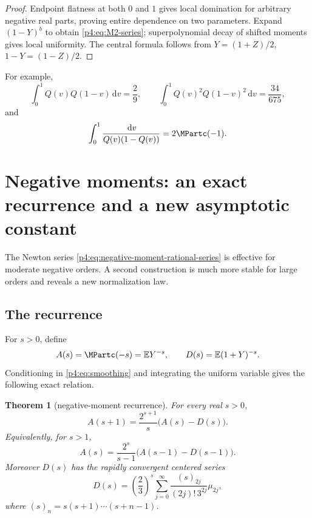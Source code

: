 \documentclass[11pt,oneside]{article}
\newtheorem{theorem}{Theorem}[section]
\theoremstyle{definition}
\theoremstyle{remark}
\newcommand{\Q}{Q}
\newcommand{\E}{\mathbb E}
\newcommand{\dd}{\,\mathrm d}
\newcommand{\1}{\mathbf 1}
\begin{document}
\begin{proof}
Endpoint flatness at both \(0\) and \(1\) gives local domination for arbitrary negative
real parts, proving entire dependence on two parameters.  Expand \((1-Y)^b\) to obtain
\cref{p4:eq:M2-series}; superpolynomial decay of shifted moments gives local uniformity.
The central formula follows from \(Y=(1+Z)/2\), \(1-Y=(1-Z)/2\).
\end{proof}

For example,
\begin{equation}\label{p4:eq:M2-examples}
 \int_0^1\Q(v)\Q(1-v)\dd v=\frac29,
 \qquad
 \int_0^1\Q(v)^2\Q(1-v)^2\dd v=\frac{34}{675},
\end{equation}
and
\begin{equation}\label{p4:eq:M2-negative-example}
 \int_0^1\frac{\dd v}{\Q(v)(1-\Q(v))}=2\MPartc(-1).
\end{equation}

\section{Negative moments: an exact recurrence and a new asymptotic constant}

The Newton series \cref{p4:eq:negative-moment-rational-series} is effective for moderate
negative orders.  A second construction is much more stable for large orders and reveals
a new normalization law.

\subsection{The recurrence}

For \(s>0\), define
\begin{equation}\label{p4:eq:A-D-def}
 A(s)=\MPartc(-s)=\E Y^{-s},
 \qquad
 D(s)=\E(1+Y)^{-s}.
\end{equation}
Conditioning in \cref{p4:eq:smoothing} and integrating the uniform variable gives the
following exact relation.

\begin{theorem}[negative-moment recurrence]\label{p4:thm:negative-recurrence}
For every real \(s>0\),
\begin{equation}\label{p4:eq:negative-recurrence}
 A(s+1)=\frac{2^{s+1}}s\bigl(A(s)-D(s)\bigr).
\end{equation}
Equivalently, for \(s>1\),
\begin{equation}\label{p4:eq:negative-recurrence-shifted}
 A(s)=\frac{2^s}{s-1}\bigl(A(s-1)-D(s-1)\bigr).
\end{equation}
Moreover \(D(s)\) has the rapidly convergent centered series
\begin{equation}\label{p4:eq:D-centered-series}
 D(s)=\left(\frac23\right)^s
 \sum_{j=0}^{\infty}
 \frac{(s)_{2j}}{(2j)!\,3^{2j}}\mu_{2j},
\end{equation}
where \((s)_n=s(s+1)\cdots(s+n-1)\).
\end{theorem}
\end{document}
